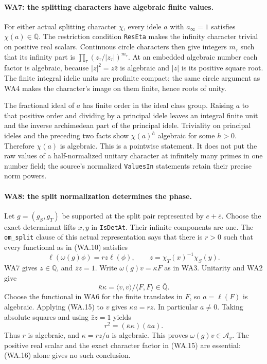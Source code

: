\paragraph{WA7: the splitting characters have algebraic finite values.}
For either actual splitting character $\chi$, every idele $a$
with $a_\infty=1$ satisfies $\chi(a)\in\overline{\mathbb Q}$.
The restriction condition \texttt{ResEta} makes the infinity
character trivial on positive real scalars.  Continuous circle
characters then give integers $m_\tau$ such that its infinity
part is $\prod_\tau(z_\tau/|z_\tau|)^{m_\tau}$.  At an embedded
algebraic number each factor is algebraic, because
$|z|^2=z\bar z$ is algebraic and $|z|$ is its positive square
root.  The finite integral idelic units are profinite compact;
the same circle argument as WA4 makes the character's image on
them finite, hence roots of unity.

The fractional ideal of $a$ has finite order in the ideal class
group.  Raising $a$ to that positive order and dividing by a
principal idele leaves an integral finite unit and the inverse
archimedean part of the principal idele.  Triviality on principal
ideles and the preceding two facts show $\chi(a)^h$ algebraic
for some $h>0$.  Therefore $\chi(a)$ is algebraic.  This is a
pointwise statement.  It does not put the raw values of a
half-normalized unitary character at infinitely many primes in
one number field; the source's normalized \texttt{ValuesIn}
statements retain their precise norm powers.

\paragraph{WA8: the split normalization determines the phase.}
Let $g=(g_S,g_T)$ be supported at the split pair represented by
$e+\bar e$.  Choose the exact determinant lifts $x,y$ in
\texttt{IsDetAt}.  Their infinite components are one.  The
\texttt{om\_split} clause of this actual representation says that
there is $r>0$ such that every functional as in (WA.10) satisfies
\[
 \ell(\omega(g)\phi)=r z\ell(\phi),\qquad
                   z=\chi_T(x)^{-1}\chi_S(y).               \tag{WA.15}
\]
WA7 gives $z\in\overline{\mathbb Q}$, and $\bar z z=1$.
Write $\omega(g)v=\kappa F$ as in WA3.  Unitarity and WA2 give
\[
            \bar\kappa\kappa=
                 \langle v,v\rangle/\langle F,F\rangle
                                  \in\overline{\mathbb Q}.  \tag{WA.16}
\]
Choose the functional in WA6 for the finite translates in $F$,
so $a=\ell(F)$ is algebraic.  Applying (WA.15) to $v$ gives
$\kappa a=rz$.  In particular $a\ne0$.  Taking absolute squares
and using $\bar z z=1$ yields
\[
                  r^2=(\bar\kappa\kappa)(\bar a a).
                                                               \tag{WA.17}
\]
Thus $r$ is algebraic, and $\kappa=rz/a$ is algebraic.  This
proves $\omega(g)v\in\mathcal A_v$.  The positive real scalar
and the exact character factor in (WA.15) are essential: (WA.16)
alone gives no such conclusion.

